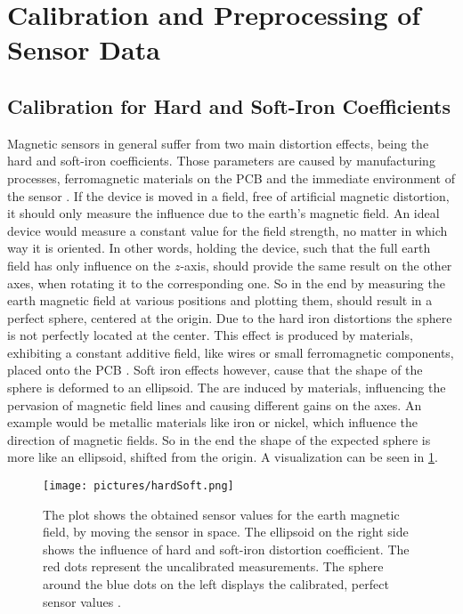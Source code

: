 \section{Calibration and Preprocessing of Sensor Data} \label{sec:caliPrepro}

\subsection{Calibration for Hard and Soft-Iron Coefficients} \label{subsec:hardSoft}

Magnetic sensors in general suffer from two main distortion effects, being the hard and soft-iron coefficients. Those parameters are caused by manufacturing processes, ferromagnetic materials on the \ac{PCB} and the immediate environment of the sensor \cite{ozyagcilar2012calibrating}. If the device is moved in a field, free of artificial magnetic distortion, it should only measure the influence due to the earth's magnetic field. An ideal device would measure a constant value for the field strength, no matter in which way it is oriented. In other words, holding the device, such that the full earth field has only influence on the $ z $-axis, should provide the same result on the other axes, when rotating it to the corresponding one. So in the end by measuring the earth magnetic field at various positions and plotting them, should result in a perfect sphere, centered at the origin. Due to the hard iron distortions the sphere is not perfectly located at the center. This effect is produced by materials, exhibiting a constant additive field, like wires or small ferromagnetic components, placed onto the \ac{PCB} \cite{konv2009}. Soft iron effects however, cause that the shape of the sphere is deformed to an ellipsoid. The are induced by materials, influencing the pervasion of magnetic field lines and causing different gains on the axes. An example would be metallic materials like iron or nickel, which influence the direction of magnetic fields. So in the end the shape of the expected sphere is more like an ellipsoid, shifted from the origin. A visualization can be seen in \ref{fig:hardSoft}.
\begin{figure}
\centering
\texttt{[image: pictures/hardSoft.png]}
\caption[Calibrated and uncalibrated sensor data]
{The plot shows the obtained sensor values for the earth magnetic field, by moving the sensor in space. The ellipsoid on the right side shows the influence of hard and soft-iron distortion coefficient. The red dots represent the uncalibrated measurements. The sphere around the blue dots on the left displays the calibrated, perfect sensor values \cite{ozyagcilar2012calibrating}.}
\label{fig:hardSoft}
\end{figure}

